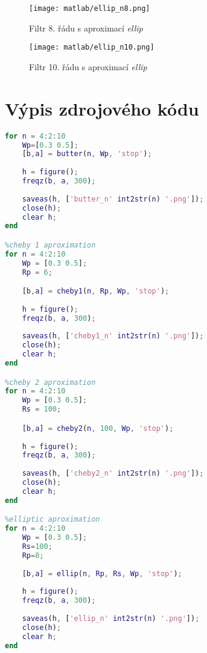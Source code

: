 \documentclass[11pt, a4paper]{article}
\begin{document}
            \begin{figure}[H]
                \centering
                \begin{minipage}{.5\textwidth}
                    \centering
                    \texttt{[image: matlab/ellip\_n8.png]}
                    \caption{Filtr 8. řádu s aproximací \textit{ellip}}
                    \label{fig:15}
                \end{minipage}%
                \begin{minipage}{.5\textwidth}
                    \centering
                    \texttt{[image: matlab/ellip\_n10.png]}
                    \caption{Filtr 10. řádu s aproximací \textit{ellip}}
                    \label{fig:16}
                \end{minipage}
            \end{figure}
            
    \section{Výpis zdrojového kódu}
    
\begin{lstlisting}[language=matlab, frame=single]    
%butter aproximation
for n = 4:2:10
    Wp=[0.3 0.5];
    [b,a] = butter(n, Wp, 'stop'); 
    
    h = figure();
    freqz(b, a, 300);
    
    saveas(h, ['butter_n' int2str(n) '.png']);
    close(h);
    clear h;
end

%cheby 1 aproximation
for n = 4:2:10
    Wp = [0.3 0.5];
    Rp = 6;

    [b,a] = cheby1(n, Rp, Wp, 'stop');
    
    h = figure();
    freqz(b, a, 300);
    
    saveas(h, ['cheby1_n' int2str(n) '.png']);
    close(h);
    clear h;
end

%cheby 2 aproximation
for n = 4:2:10
    Wp = [0.3 0.5];
    Rs = 100;

    [b,a] = cheby2(n, 100, Wp, 'stop');
    
    h = figure();
    freqz(b, a, 300);
    
    saveas(h, ['cheby2_n' int2str(n) '.png']);
    close(h);
    clear h;
end

%elliptic aproximation
for n = 4:2:10
    Wp = [0.3 0.5];
    Rs=100;
    Rp=8;
    
    [b,a] = ellip(n, Rp, Rs, Wp, 'stop');
    
    h = figure();
    freqz(b, a, 300);
    
    saveas(h, ['ellip_n' int2str(n) '.png']);
    close(h);
    clear h;
end
\end{lstlisting}
\end{document}
